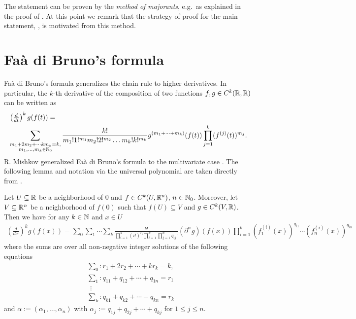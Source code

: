 The statement can be proven by the \emph{method of majorants}, e.g.\ as explained in the proof of  \cite[2.4.1]{KrantzParks:2002:Aprimerofrealanalyticfunctions}. At this point we remark that the strategy of proof for the main statement, , is motivated from this method.



\section{Faà di Bruno's formula}

Faà di Bruno's formula generalizes the chain rule to higher derivatives. In particular, the $k$-th derivative of the composition of two functions $f, g\in C^k (\mathbb{R},\mathbb{R})$ can be written as
\begin{align*}
&\left(\tfrac{d}{dt}\right)^k g(f(t)) = \\
&\sum_{\substack{m_1+2m_2+ \cdots km_k=k, \\ m_1,\ldots,m_k\in\mathbb{N}_0}} \frac{k!}{m_1!1!^{m_1}m_2!2!^{m_2}\ldots m_k!k!^{m_k}} g^{(m_1+\cdots +m_k)}(f(t))\prod_{j=1}^{k} (f^{(j)} (t))^{m_j}.
\end{align*}
R. Mishkov generalized Faà di Bruno's formula to the multivariate case \cite{Mishkov:2000:GeneralizationFormulaFaa}.
The following lemma and notation via the universal polynomial are taken directly from \cite[Section~2.3]{BlattVorderobermeier:2019:CriticalMoebius}.
\begin{lemma}\label{lem:FaadiBruno}
	Let $U\subseteq\mathbb{R}$ be a neighborhood of $0$ and $f\in C^k(U, \mathbb{R}^n)$, $n\in\mathbb{N}_0$. Moreover, let $V\subseteq\mathbb{R}^n$ be a neighborhood of $f(0)$ such that $f(U)\subseteq V$ and $g\in C^k(V, \mathbb{R})$. Then we have for any $k\in\mathbb{N}$ and $x\in U$ 
	\begin{align*}
	\left(\!\tfrac{d}{dx}\!\right)^k g(f(x)) \!=\! \sum_0 \sum_1 \cdots \sum_k \frac{k!}{\prod_{i=1}^k (i!)^{r_i} \prod_{i=1}^k\prod_{j=1}^nq_{ij}! }  (\partial^\alpha g) (f(x)) \prod_{i=1}^k ( f_1^{(i)}(x))^{q_{i1}} \cdots ( f_n^{(i)}(x))^{q_{in}}
	\end{align*}
	where the sums are over all non-negative integer solutions of the following equations
	\begin{align*}
	& \sum_0 :  r_1 + 2r_2 + \cdots + k r_k = k, \\
	& \sum_1 : q_{11} + q_{12} + \cdots + q_{1n} = r_1 \\
	& \ \ \vdots  \\
	& \sum_k  : q_{k1} + q_{k2} + \cdots + q_{kn} = r_k
	\end{align*}
	and $\alpha := (\alpha_1,\ldots,\alpha_n)$ with $\alpha_j := q_{1j} + q_{2j} + \cdots + q_{kj}$ for $1\leq j \leq n$. 	
\end{lemma}

